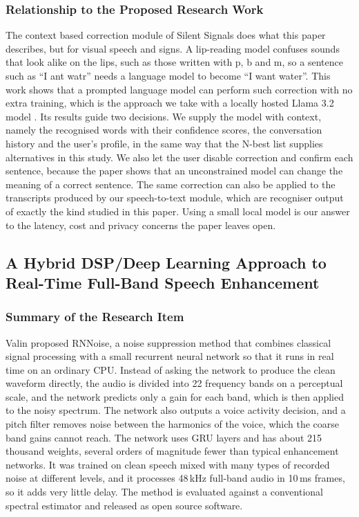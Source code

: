 \documentclass{FastFyp}
\begin{document}
\subsubsection*{Relationship to the Proposed Research Work}
The context based correction module of Silent Signals does what this paper describes, but for visual speech and signs. A lip-reading model confuses sounds that look alike on the lips, such as those written with p, b and m, so a sentence such as ``I ant watr'' needs a language model to become ``I want water''. This work shows that a prompted language model can perform such correction with no extra training, which is the approach we take with a locally hosted Llama 3.2 model \cite{ollama_llama32_3b}. Its results guide two decisions. We supply the model with context, namely the recognised words with their confidence scores, the conversation history and the user's profile, in the same way that the N-best list supplies alternatives in this study. We also let the user disable correction and confirm each sentence, because the paper shows that an unconstrained model can change the meaning of a correct sentence. The same correction can also be applied to the transcripts produced by our speech-to-text module, which are recogniser output of exactly the kind studied in this paper. Using a small local model is our answer to the latency, cost and privacy concerns the paper leaves open.

\subsection{A Hybrid DSP/Deep Learning Approach to Real-Time Full-Band Speech Enhancement}
\subsubsection*{Summary of the Research Item}
Valin \cite{valin2018hybrid} proposed RNNoise, a noise suppression method that combines classical signal processing with a small recurrent neural network so that it runs in real time on an ordinary CPU. Instead of asking the network to produce the clean waveform directly, the audio is divided into 22 frequency bands on a perceptual scale, and the network predicts only a gain for each band, which is then applied to the noisy spectrum. The network also outputs a voice activity decision, and a pitch filter removes noise between the harmonics of the voice, which the coarse band gains cannot reach. The network uses GRU layers and has about 215 thousand weights, several orders of magnitude fewer than typical enhancement networks. It was trained on clean speech mixed with many types of recorded noise at different levels, and it processes 48\,kHz full-band audio in 10\,ms frames, so it adds very little delay. The method is evaluated against a conventional spectral estimator and released as open source software.
\end{document}

